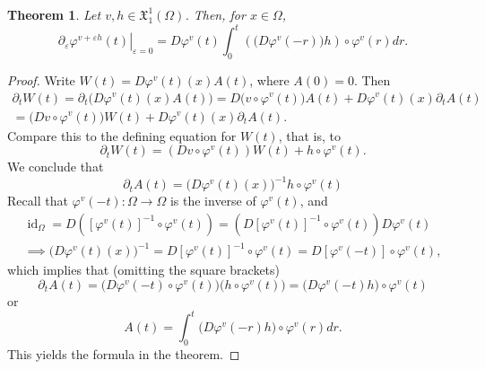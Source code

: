 \documentclass[a5paper,11pt,twoside]{article}
\theoremstyle{plain}
\newtheorem{teo}{Theorem}[section]
\newcommand{\X}{\ensuremath{\mathfrak{X}}}
\newcommand{\id}{\operatorname{id}}
\theoremstyle{definition}
\begin{document}
\begin{teo}
Let $v,h\in \X_1^1(\Omega)$. Then, for $x\in\Omega$,
\[
\left.\partial_\varepsilon\varphi^{v+\varepsilon h}(t)\right|_{\varepsilon=0}=D\varphi^v(t)\int_0^t\left(\big(D\varphi^v(-r)\big)h\right)\circ \varphi^v(r) dr.
\]
\end{teo}

\begin{proof}
Write $W(t)=D\varphi^v(t)(x)A(t)$, where $A(0)=0$. Then
\begin{multline*}
\partial_tW(t)=\partial_t\big(D\varphi^v(t)(x)A(t)\big)=D\big(v\circ \varphi^v(t)\big)A(t)+D\varphi^v(t)(x)\partial_tA(t)\\
=\big(Dv\circ \varphi^v(t)\big)W(t)+D\varphi^v(t)(x)\partial_tA(t).
\end{multline*}
%
Compare this to the defining equation for $W(t)$, that is, to
\[
\partial_t W(t)=\left(Dv\circ \varphi^v(t)\right)W(t)+h\circ \varphi^v(t).
\]
We conclude that
\[
\partial_tA(t)=\big(D\varphi^v(t)(x)\big)^{-1}h\circ \varphi^v(t)
\]
Recall that $\varphi^v(-t):\Omega\to\Omega$ is the inverse of $\varphi^v(t)$, and
\begin{multline*}
\id_\Omega=D\left([\varphi^v(t)]^{-1}\circ\varphi^v(t)\right)=\left(D[\varphi^v(t)]^{-1}\circ \varphi^v(t)\right)D\varphi^v(t) \\
\implies \big(D\varphi^v(t)(x)\big)^{-1}=D[\varphi^v(t)]^{-1}\circ \varphi^v(t)=D[\varphi^v(-t)]\circ \varphi^v(t),
\end{multline*}
which implies that (omitting the square brackets)
\[
\partial_tA(t)=\big(D\varphi^v(-t)\circ \varphi^v(t)\big)\big(h\circ  \varphi^v(t)\big)=\big(D\varphi^v(-t)h\big)\circ \varphi^v(t)
\]
or
\[
A(t)=\int_0^t\big(D\varphi^v(-r)h\big)\circ \varphi^v(r) dr.
\]
This yields the formula in the theorem.
\end{proof}
\end{document}
